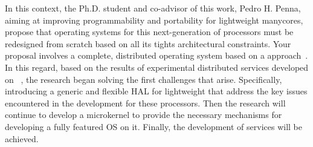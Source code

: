 

    In this context, the Ph.D. student and co-advisor of this work, Pedro H. Penna, aiming at improving programmability and portability for lightweight manycores, propose that operating systems for this next-generation of processors must be redesigned from scratch based on all its tights architectural constraints.
    Your proposal involves a complete, distributed operating system based on a \multikernel approach~\cite{multikernel}.
    In this regard, based on the results of experimental distributed services developed on \mppa~\cite{rmem}, the research began solving the first challenges that arise.
    Specifically, introducing a generic and flexible HAL for lightweight \manycores that address the key issues encountered in the development for these processors.
    Then the research will continue to develop a microkernel to provide the necessary mechanisms for developing a fully featured OS on it.
    Finally, the development of \multikernel services will be achieved.


